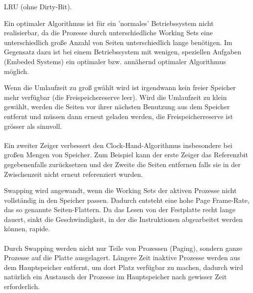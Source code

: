 \begin{answer}
  LRU (ohne Dirty-Bit).
\end{answer}

\begin{multilinequestion}
\end{multilinequestion}

\begin{answer}
  Ein optimaler Algorithmus ist für ein 'normales' Betriebssystem nicht realisierbar, da die Prozesse
  durch unterschiedliche Working Sets eine unterschiedlich große Anzahl von Seiten unterschiedlich
  lange benötigen.
  Im Gegensatz dazu ist bei einem Betriebssystem mit wenigen, speziellen Aufgaben (Embeded
  Systems) ein optimaler bzw. annähernd optimaler Algorithmus möglich.
\end{answer}

\begin{answer}
  Wenn die Umlaufzeit zu groß gwählt wird ist irgendwann kein freier Speicher mehr verfügbar (die Freispeichereserve leer). Wird die Umlaufzeit zu klein gewählt, werden die Seiten vor ihrer nächsten Benutzung aus dem Speicher entfernt und müssen dann erneut geladen werden, die Freispeicherreserve ist grösser als sinnvoll.

  \paragraph*{}
  Ein zweiter Zeiger verbessert den Clock-Hand-Algorithmus insbesondere bei großen Mengen von Speicher. Zum Beispiel kann der erste Zeiger das Referenzbit gegebenenfalls zurücksetzen und der Zweite die
  Seiten entfernen falls sie in der Zwischenzeit nicht erneut referenziert wurden.
\end{answer}

\begin{answer}
  Swapping wird angewandt, wenn die Working Sets der aktiven Prozesse nicht vollständig in den Speicher passen. Dadurch entsteht eine hohe Page Frame-Rate, das so genannte Seiten-Flattern. Da das Lesen von der Festplatte recht lange dauert, sinkt die Geschwindigkeit, in der die Instruktionen abgearbeitet werden können, rapide.

  \paragraph*{}
  Durch Swapping werden nicht nur Teile von Prozessen (Paging), sondern ganze Prozesse auf die Platte ausgelagert. Längere Zeit inaktive Prozesse werden aus dem Hauptspeicher entfernt, um dort Platz verfügbar zu machen, dadurch wird natürlich ein Austausch der Prozesse im Hauptspeicher nach gewisser Zeit erforderlich.
\end{answer}


